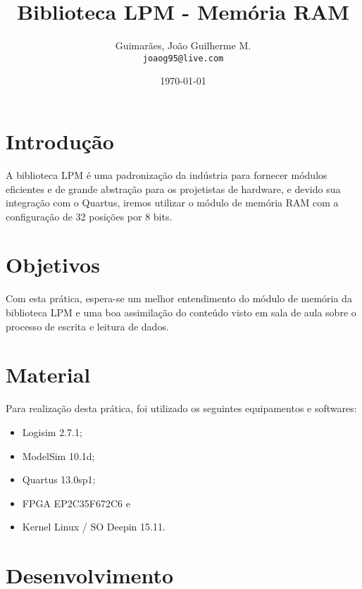 \documentclass[12pt, a4paper]{article}
\title{\textbf{Biblioteca LPM - Memória RAM}}
\author{
	Guimarães, João Guilherme M.\\
	\texttt{joaog95@live.com}
}
\date{\today}
\begin{document}
	\maketitle
	
	\vspace{1cm}
	
	\section{Introdução}
	
	\par A biblioteca LPM é uma padronização da indústria para fornecer módulos eficientes e de grande abstração para os projetistas de hardware, e devido sua integração com o Quartus, iremos utilizar o módulo de memória RAM com a configuração de 32 posições por 8 bits.
	
	\section{Objetivos}
	
	\par Com esta prática, espera-se um melhor entendimento do módulo de memória da biblioteca LPM e uma boa assimilação do conteúdo visto em sala de aula sobre o processo de escrita e leitura de dados.
	
	\section{Material}
	
	\par Para realização desta prática, foi utilizado os seguintes equipamentos e softwares:
	
	\begin{itemize}
		\item Logisim 2.7.1;
		\item ModelSim 10.1d;
		\item Quartus 13.0sp1;
		\item FPGA EP2C35F672C6 e
		\item Kernel Linux / SO Deepin 15.11.
	\end{itemize}
	
	\vspace{\baselineskip}	
	

    \section{Desenvolvimento}
    
\end{document}
